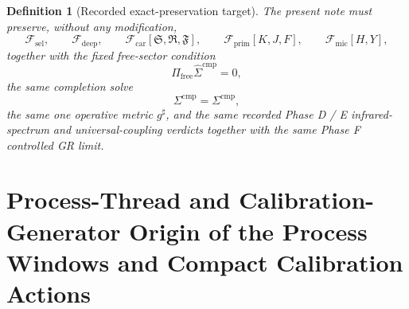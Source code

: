 \documentclass[11pt]{article}
\newcommand{\CompletedMetric}{g^{\sharp}}
\newcommand{\CompShift}{\Sigma^{\mathrm{cmp}}}
\newcommand{\CompLift}{\widehat\Sigma^{\mathrm{cmp}}}
\newcommand{\FreeProj}{\Pi_{\mathrm{free}}}
\newcommand{\GaugeAux}{Y}
\newcommand{\MicFunctional}{\mathscr F_{\mathrm{mic}}}
\newcommand{\PrimFunctional}{\mathscr F_{\mathrm{prim}}}
\newcommand{\CarrierFunctional}{\mathscr F_{\mathrm{car}}}
\newcommand{\DeepFunctional}{\mathscr F_{\mathrm{deep}}}
\newcommand{\StemFunctional}{\mathscr F_{\mathrm{sel}}}
\newcommand{\PrimStrain}{K}
\newcommand{\PrimNeutral}{J}
\newcommand{\PrimFree}{F}
\newcommand{\CarrierSeed}{\mathfrak S}
\newcommand{\RelabelSeed}{\mathfrak R}
\newcommand{\FreeSeed}{\mathfrak F}
\newtheorem{definition}{Definition}
\begin{document}
\begin{definition}[Recorded exact-preservation target]
\label{def:recorded_target}
The present note must preserve, without any modification,
\begin{equation}
\StemFunctional,
\qquad
\DeepFunctional,
\qquad
\CarrierFunctional[\CarrierSeed,\RelabelSeed,\FreeSeed],
\qquad
\PrimFunctional[\PrimStrain,\PrimNeutral,\PrimFree],
\qquad
\MicFunctional[H,\GaugeAux],
\label{eq:target_functionals}
\end{equation}
together with the fixed free-sector condition
\begin{equation}
\FreeProj\CompLift=0,
\label{eq:target_free}
\end{equation}
the same completion solve
\begin{equation}
\CompShift=\Sigma^{\mathrm{cmp}},
\label{eq:target_sigma}
\end{equation}
the same one operative metric \(\CompletedMetric\), and the same recorded Phase D / E infrared-spectrum and universal-coupling verdicts together with the same Phase F controlled GR limit.
\end{definition}

\section{Process-Thread and Calibration-Generator Origin of the Process Windows and Compact Calibration Actions}
\end{document}
